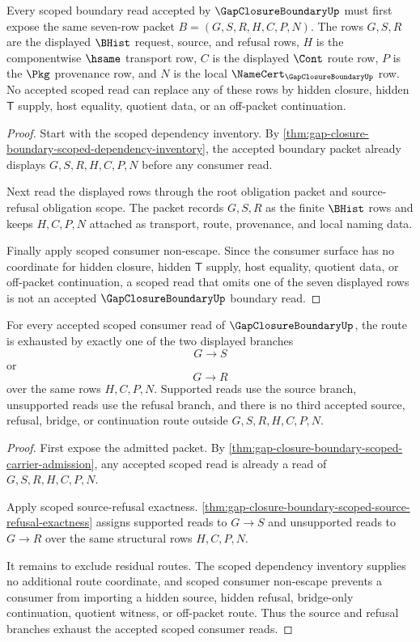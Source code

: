 \begin{theorem}
\label{thm:gap-closure-boundary-scoped-carrier-admission}
Every scoped boundary read accepted by $\GapClosureBoundaryUp$ must first expose the same seven-row packet $B=(G,S,R,H,C,P,N)$. The rows $G,S,R$ are the displayed $\BHist$ request, source, and refusal rows, $H$ is the componentwise $\hsame$ transport row, $C$ is the displayed $\Cont$ route row, $P$ is the $\Pkg$ provenance row, and $N$ is the local $\NameCert_{\GapClosureBoundaryUp}$ row. No accepted scoped read can replace any of these rows by hidden closure, hidden $\mathsf{T}$ supply, host equality, quotient data, or an off-packet continuation.
\end{theorem}
\begin{proof}
Start with the scoped dependency inventory. By \autoref{thm:gap-closure-boundary-scoped-dependency-inventory}, the accepted boundary packet already displays $G,S,R,H,C,P,N$ before any consumer read.

Next read the displayed rows through the root obligation packet and source-refusal obligation scope. The packet records $G,S,R$ as the finite $\BHist$ rows and keeps $H,C,P,N$ attached as transport, route, provenance, and local naming data.

Finally apply scoped consumer non-escape. Since the consumer surface has no coordinate for hidden closure, hidden $\mathsf{T}$ supply, host equality, quotient data, or off-packet continuation, a scoped read that omits one of the seven displayed rows is not an accepted $\GapClosureBoundaryUp$ boundary read.
\end{proof}

\begin{theorem}
\label{thm:gap-closure-boundary-scoped-route-totality}
For every accepted scoped consumer read of $\GapClosureBoundaryUp$, the route is exhausted by exactly one of the two displayed branches
$$
G \longrightarrow S
$$
or
$$
G \longrightarrow R
$$
over the same rows $H,C,P,N$. Supported reads use the source branch, unsupported reads use the refusal branch, and there is no third accepted source, refusal, bridge, or continuation route outside $G,S,R,H,C,P,N$.
\end{theorem}
\begin{proof}
First expose the admitted packet. By \autoref{thm:gap-closure-boundary-scoped-carrier-admission}, any accepted scoped read is already a read of $G,S,R,H,C,P,N$.

Apply scoped source-refusal exactness. \autoref{thm:gap-closure-boundary-scoped-source-refusal-exactness} assigns supported reads to $G \longrightarrow S$ and unsupported reads to $G \longrightarrow R$ over the same structural rows $H,C,P,N$.

It remains to exclude residual routes. The scoped dependency inventory supplies no additional route coordinate, and scoped consumer non-escape prevents a consumer from importing a hidden source, hidden refusal, bridge-only continuation, quotient witness, or off-packet route. Thus the source and refusal branches exhaust the accepted scoped consumer reads.
\end{proof}

